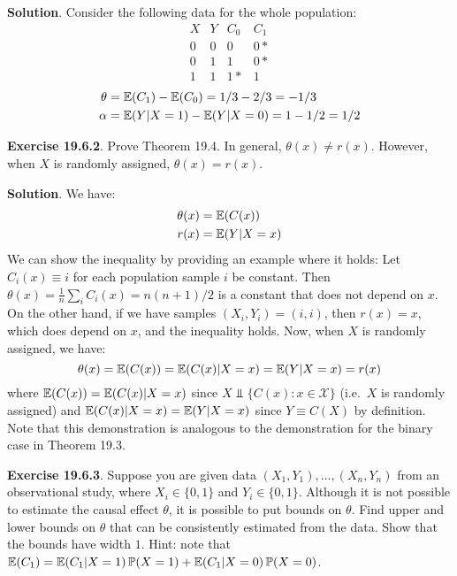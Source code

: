 \textbf{Solution}. Consider the following data for the whole population:
\[
\begin{array}{cccc}
X & Y & C_{0} & C_{1} \\
\hline
0 & 0 & 0 & 0* \\
0 & 1 & 1 & 0* \\
\hline
1 & 1 & 1* & 1
\end{array}
\]
\begin{align*}
\theta &= \operatorname{\mathbb{E}}(C_{1}) - \operatorname{\mathbb{E}}(C_{0}) = 1/3 - 2/3 = -1/3 \\
\alpha &= \operatorname{\mathbb{E}}(Y | X = 1) - \operatorname{\mathbb{E}}(Y | X = 0) = 1 - 1/2 = 1/2
\end{align*}

\textbf{Exercise 19.6.2}. Prove Theorem 19.4.
In general, \(\theta(x) \neq r(x)\). However, when \(X\) is randomly assigned, \(\theta(x) = r(x)\).

\textbf{Solution}. We have:
\begin{align*}
\theta(x) &= \operatorname{\mathbb{E}}(C(x)) \\
r(x) &= \operatorname{\mathbb{E}}(Y | X = x)
\end{align*}
We can show the inequality by providing an example where it holds:
Let \(C_{i}(x) \equiv i\) for each population sample \(i\) be constant. Then \(\theta(x) = \frac{1}{n} \sum_{i} C_{i}(x) = n (n+1) / 2\) is a constant that does not depend on \(x\). On the other hand, if we have samples \((X_{i}, Y_{i}) = (i, i)\), then \(r(x) = x\), which does depend on \(x\), and the inequality holds.
Now, when \(X\) is randomly assigned, we have:
\[
\theta(x) = \operatorname{\mathbb{E}}(C(x)) = \operatorname{\mathbb{E}}(C(x) | X = x) = \operatorname{\mathbb{E}}(Y | X = x) = r(x)
\]
where \(\operatorname{\mathbb{E}}(C(x)) = \operatorname{\mathbb{E}}(C(x) | X = x)\) since \(X \text{ ⫫  } \{ C(x) : x \in \mathcal{X} \}\) (i.e.~\(X\) is randomly assigned) and \(\operatorname{\mathbb{E}}(C(x) | X = x) = \operatorname{\mathbb{E}}(Y | X = x)\) since \(Y \equiv C(X)\) by definition.
Note that this demonstration is analogous to the demonstration for the binary case in Theorem 19.3.

\textbf{Exercise 19.6.3}. Suppose you are given data \((X_{1}, Y_{1}), \dots, (X_{n}, Y_{n})\) from an observational study, where \(X_{i} \in \{0, 1\}\) and \(Y_{i} \in \{0, 1\}\). Although it is not possible to estimate the causal effect \(\theta\), it is possible to put bounds on \(\theta\). Find upper and lower bounds on \(\theta\) that can be consistently estimated from the data. Show that the bounds have width \(1\).
Hint: note that \(\operatorname{\mathbb{E}}(C_{1}) = \operatorname{\mathbb{E}}(C_{1} | X = 1) \operatorname{\mathbb{P}}(X = 1) + \operatorname{\mathbb{E}}(C_{1} | X = 0) \operatorname{\mathbb{P}}(X = 0)\).

